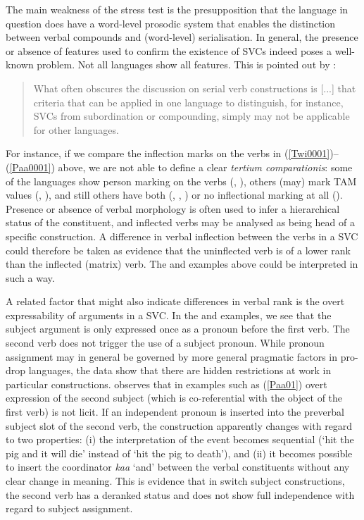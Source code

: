 \newpage
The main weakness of the stress test is the presupposition that the language in question does have a word-level prosodic system that enables the distinction between verbal compounds and (word-level) serialisation. In general, the presence or absence of features used to confirm the existence of SVCs indeed poses a well-known problem. Not all languages show all features. This is pointed out by \citet[22]{vanstaden2008serial}: 

\begin{quote}What often obscures the discussion on serial verb constructions is [...] that criteria that can be applied in one language to distinguish, for instance, SVCs from subordination or compounding, simply may not be applicable for other languages.\end{quote}

For instance, if we compare the inflection marks on the verbs in (\ref{Twi0001})--(\ref{Paa0001}) above, we are not able to define a clear \textit{tertium comparationis}: some of the languages show person marking on the verbs (, ), others (may) mark TAM values (, ), and still others have both (, , ) or no inflectional marking at all (). Presence or absence of verbal morphology is often used to infer a hierarchical status of the constituent, and inflected verbs may be analysed as being head of a specific construction. A difference in verbal inflection between the verbs in a SVC could therefore be taken as evidence that the uninflected verb is of a lower rank than the inflected (matrix) verb. The  and  examples above could be interpreted in such a way. 

A related factor that might also indicate differences in verbal rank is the overt expressability of arguments in a SVC. In the  and  examples, we see that the subject argument is only expressed once as a pronoun before the first verb. The second verb does not trigger the use of a subject pronoun. While pronoun assignment may in general be governed by more general pragmatic factors in pro-drop languages, the  data show that there are hidden restrictions at work in particular constructions. \citet{crowley2002serial} observes that in examples such as (\ref{Paa01}) overt expression of the second subject (which is co-referential with the object of the first verb) is not licit. If an independent pronoun is inserted into the preverbal subject slot of the second verb, the construction apparently changes with regard to two properties: (i) the interpretation of the event becomes sequential (`hit the pig and it will die' instead of `hit the pig to death'), and (ii) it becomes possible to insert the coordinator \textit{kaa} `and' between the verbal constituents without any clear change in meaning. This is evidence that in  switch subject constructions, the second verb has a deranked status and does not show full independence with regard to subject assignment.

